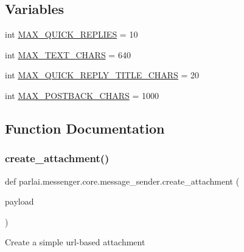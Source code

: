 \subsection*{Variables}
\begin{DoxyCompactItemize}
\item 
int \hyperlink{namespaceparlai_1_1messenger_1_1core_1_1message__sender_a96fe2d14734c84fe282de28cb03b2301}{M\+A\+X\+\_\+\+Q\+U\+I\+C\+K\+\_\+\+R\+E\+P\+L\+I\+ES} = 10
\item 
int \hyperlink{namespaceparlai_1_1messenger_1_1core_1_1message__sender_a29e274aca6cfe0c05417565bcae456b9}{M\+A\+X\+\_\+\+T\+E\+X\+T\+\_\+\+C\+H\+A\+RS} = 640
\item 
int \hyperlink{namespaceparlai_1_1messenger_1_1core_1_1message__sender_a896cae6f3c68db97df9820726f738fd1}{M\+A\+X\+\_\+\+Q\+U\+I\+C\+K\+\_\+\+R\+E\+P\+L\+Y\+\_\+\+T\+I\+T\+L\+E\+\_\+\+C\+H\+A\+RS} = 20
\item 
int \hyperlink{namespaceparlai_1_1messenger_1_1core_1_1message__sender_a2f6531e51639866a10b3b0442c0579f2}{M\+A\+X\+\_\+\+P\+O\+S\+T\+B\+A\+C\+K\+\_\+\+C\+H\+A\+RS} = 1000
\end{DoxyCompactItemize}


\subsection{Function Documentation}
\mbox{\label{namespaceparlai_1_1messenger_1_1core_1_1message__sender_ae26a16d26bdd28795220ad9ef76c96fd}} 
\subsubsection{\texorpdfstring{create\+\_\+attachment()}{create\_attachment()}}
{\footnotesize\ttfamily def parlai.\+messenger.\+core.\+message\+\_\+sender.\+create\+\_\+attachment (\begin{DoxyParamCaption}\item[{}]{payload }\end{DoxyParamCaption})}

\begin{DoxyVerb}Create a simple url-based attachment\end{DoxyVerb}
 

